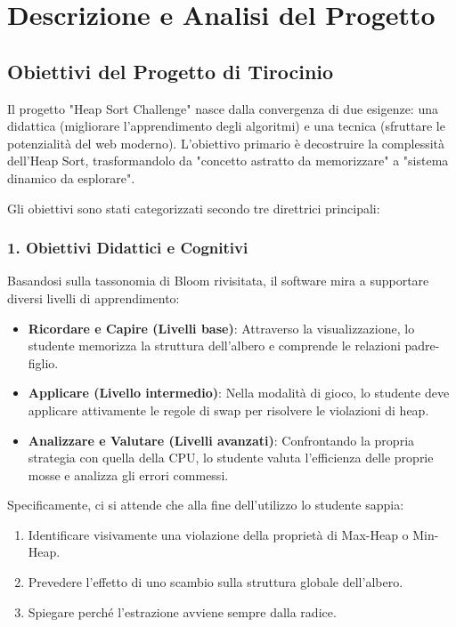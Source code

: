 \documentclass[openany]{theme/uniprthesis}
\begin{document}
\newpage

\chapter{Descrizione e Analisi del Progetto}

\section{Obiettivi del Progetto di Tirocinio}
Il progetto "Heap Sort Challenge" nasce dalla convergenza di due esigenze: una didattica (migliorare l'apprendimento degli algoritmi) e una tecnica (sfruttare le potenzialità del web moderno).
L'obiettivo primario è decostruire la complessità dell'Heap Sort, trasformandolo da "concetto astratto da memorizzare" a "sistema dinamico da esplorare".

Gli obiettivi sono stati categorizzati secondo tre direttrici principali:

\subsection{1. Obiettivi Didattici e Cognitivi}
Basandosi sulla tassonomia di Bloom rivisitata, il software mira a supportare diversi livelli di apprendimento:
\begin{itemize}
    \item \textbf{Ricordare e Capire (Livelli base)}: Attraverso la visualizzazione, lo studente memorizza la struttura dell'albero e comprende le relazioni padre-figlio.
    \item \textbf{Applicare (Livello intermedio)}: Nella modalità di gioco, lo studente deve applicare attivamente le regole di swap per risolvere le violazioni di heap.
    \item \textbf{Analizzare e Valutare (Livelli avanzati)}: Confrontando la propria strategia con quella della CPU, lo studente valuta l'efficienza delle proprie mosse e analizza gli errori commessi.
\end{itemize}
Specificamente, ci si attende che alla fine dell'utilizzo lo studente sappia:
\begin{enumerate}
    \item Identificare visivamente una violazione della proprietà di Max-Heap o Min-Heap.
    \item Prevedere l'effetto di uno scambio sulla struttura globale dell'albero.
    \item Spiegare perché l'estrazione avviene sempre dalla radice.
\end{enumerate}
\end{document}
